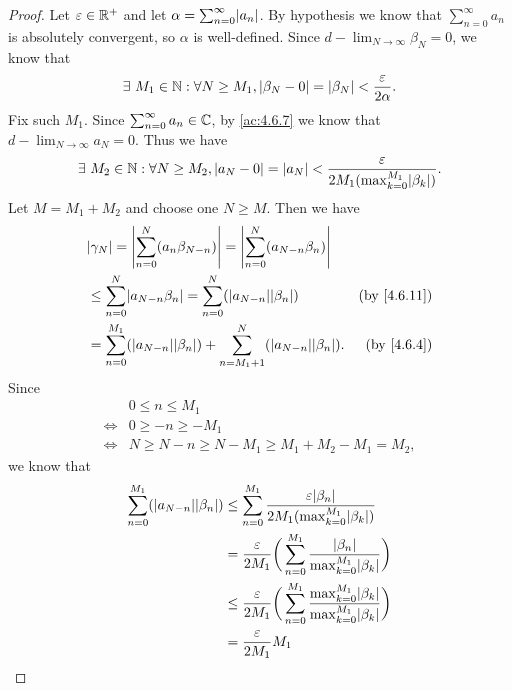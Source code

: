 \begin{proof}
  Let \(\varepsilon \in \mathbb{R}^+\) and let \(\alpha = \sum_{n = 0}^\infty \abs{a_n}\).
  By hypothesis we know that \(\sum_{n = 0}^\infty a_n\) is absolutely convergent, so \(\alpha\) is well-defined.
  Since \(d - \lim_{N \to \infty} \beta_N = 0\), we know that
  \[
    \exists\ M_1 \in \mathbb{N} : \forall N \geq M_1, \left\lvert\beta_N - 0\right\rvert = \left\lvert\beta_N\right\rvert < \frac{\varepsilon}{2 \alpha}.
  \]
  Fix such \(M_1\).
  Since \(\sum_{n = 0}^\infty a_n \in \mathbb{C}\), by \cref{ac:4.6.7} we know that \(d - \lim_{N \to \infty} a_N = 0\).
  Thus we have
  \[
    \exists\ M_2 \in \N : \forall N \geq M_2, \abs{a_N - 0} = \abs{a_N} < \frac{\varepsilon}{2 M_1 (\max_{k = 0}^{M_1} \abs{\beta_k})}.
  \]
  Let \(M = M_1 + M_2\) and choose one \(N \geq M\).
  Then we have
  \begin{align*}
     & \abs{\gamma_N} = \abs{\sum_{n = 0}^N (a_n \beta_{N - n})} = \abs{\sum_{n = 0}^N (a_{N - n} \beta_n)}                                     \\
     & \leq \sum_{n = 0}^N \abs{a_{N - n} \beta_n} = \sum_{n = 0}^N (\abs{a_{N - n}} \abs{\beta_n})                 & \text{(by \cref{4.6.11})} \\
     & = \sum_{n = 0}^{M_1} (\abs{a_{N - n}} \abs{\beta_n}) + \sum_{n = M_1 + 1}^N (\abs{a_{N - n}} \abs{\beta_n}). & \text{(by \cref{4.6.4})}
  \end{align*}
  Since
  \begin{align*}
         & 0 \leq n \leq M_1                                     \\
    \iff & 0 \geq -n \geq -M_1                                   \\
    \iff & N \geq N - n \geq N - M_1 \geq M_1 + M_2 - M_1 = M_2,
  \end{align*}
  we know that
  \begin{align*}
    \sum_{n = 0}^{M_1} (\abs{a_{N - n}} \abs{\beta_n}) & \leq \sum_{n = 0}^{M_1} \frac{\varepsilon \abs{\beta_n}}{2 M_1 (\max_{k = 0}^{M_1} \abs{\beta_k})}                                      \\
                                                       & = \frac{\varepsilon}{2 M_1} \bigg(\sum_{n = 0}^{M_1} \frac{\abs{\beta_n}}{\max_{k = 0}^{M_1} \abs{\beta_k}}\bigg)                       \\
                                                       & \leq \frac{\varepsilon}{2 M_1} \bigg(\sum_{n = 0}^{M_1} \frac{\max_{k = 0}^{M_1} \abs{\beta_k}}{\max_{k = 0}^{M_1} \abs{\beta_k}}\bigg) \\
                                                       & = \frac{\varepsilon}{2 M_1} M_1                                                                                                         \\

\end{align*}
\end{proof}

